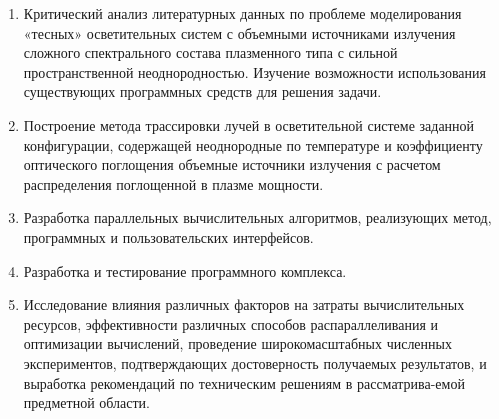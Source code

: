 \begin{enumerate}
	\item Критический анализ литературных данных по проблеме моделирования «тесных» осветительных систем с объемными источниками излучения сложного спектрального состава плазменного типа  с сильной пространственной неоднородностью.
	Изучение возможности использования существующих программных средств для решения задачи.

	\item Построение метода трассировки лучей в осветительной системе заданной конфигурации, содержащей неоднородные по температуре и коэффициенту оптического поглощения объемные источники излучения с расчетом  распределения поглощенной в плазме мощности.

	\item Разработка параллельных вычислительных алгоритмов, реализующих метод, программных и пользовательских интерфейсов.

	\item Разработка и тестирование программного комплекса.

	\item Исследование влияния различных факторов на затраты вычислительных ресурсов, эффективности различных способов распараллеливания и оптимизации вычислений, проведение широкомасштабных численных экспериментов, подтверждающих достоверность получаемых результатов,  и выработка рекомендаций по техническим решениям в рассматрива-емой предметной области.
\end{enumerate}
